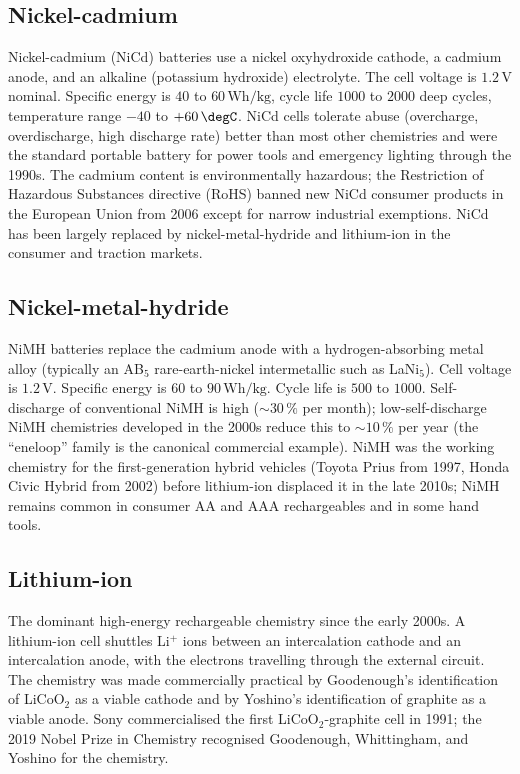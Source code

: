 \subsection{Nickel-cadmium}

Nickel-cadmium (NiCd) batteries use a nickel oxyhydroxide cathode, a
cadmium anode, and an alkaline (potassium hydroxide) electrolyte. The
cell voltage is $1.2\,\text{V}$ nominal. Specific energy is $40$ to
$60\,\text{Wh}/\text{kg}$, cycle life $1000$ to $2000$ deep cycles,
temperature range $-40$ to $+60\,\degC$. NiCd cells tolerate abuse
(overcharge, overdischarge, high discharge rate) better than most
other chemistries and were the standard portable battery for power
tools and emergency lighting through the 1990s. The cadmium content
is environmentally hazardous; the Restriction of Hazardous Substances
directive (RoHS) banned new NiCd consumer products in the European
Union from 2006 except for narrow industrial exemptions. NiCd has
been largely replaced by nickel-metal-hydride and lithium-ion in the
consumer and traction markets.

\subsection{Nickel-metal-hydride}

NiMH batteries replace the cadmium anode with a hydrogen-absorbing
metal alloy (typically an AB$_5$ rare-earth-nickel intermetallic such
as LaNi$_5$). Cell voltage is $1.2\,\text{V}$. Specific energy
is $60$ to $90\,\text{Wh}/\text{kg}$. Cycle life is $500$ to $1000$.
Self-discharge of conventional NiMH is high ($\sim 30\,\%$ per month);
low-self-discharge NiMH chemistries developed in the 2000s reduce
this to $\sim 10\,\%$ per year (the ``eneloop'' family is the
canonical commercial example). NiMH was the working chemistry for the
first-generation hybrid vehicles (Toyota Prius from 1997, Honda Civic
Hybrid from 2002) before lithium-ion displaced it in the late 2010s;
NiMH remains common in consumer AA and AAA rechargeables and in some
hand tools.

\subsection{Lithium-ion}

The dominant high-energy rechargeable chemistry since the early 2000s.
A lithium-ion cell shuttles Li$^+$ ions between an intercalation
cathode and an intercalation anode, with the electrons travelling
through the external circuit. The chemistry was made commercially
practical by Goodenough's identification of LiCoO$_2$ as a viable
cathode \cite{hist:goodenough1980} and by Yoshino's identification of
graphite as a viable anode. Sony commercialised the first
LiCoO$_2$-graphite cell in 1991; the 2019 Nobel Prize in Chemistry
recognised Goodenough, Whittingham, and Yoshino for the chemistry.

